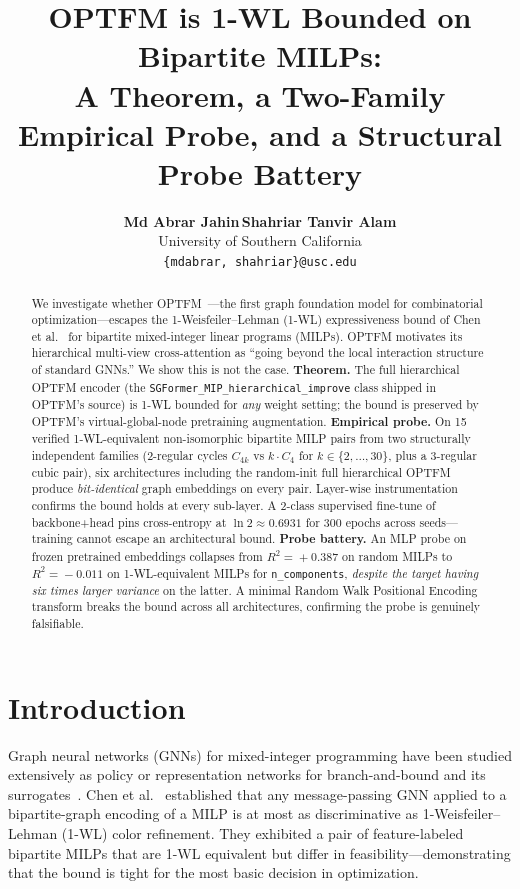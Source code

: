 \documentclass[11pt]{article}
\title{\vspace{-1.3cm}\textbf{\Large OPTFM is 1-WL Bounded on Bipartite MILPs:\\
A Theorem, a Two-Family Empirical Probe, and a Structural Probe Battery}}
\author{
\textbf{Md Abrar Jahin}\;\,\textbf{Shahriar Tanvir Alam}\\
University of Southern California\\
\texttt{\{mdabrar, shahriar\}@usc.edu}
}
\date{}
\theoremstyle{plain}
\theoremstyle{definition}
\theoremstyle{remark}
\newcommand{\optfm}{\textsc{OPTFM}}
\begin{document}
\maketitle
\thispagestyle{empty}

\begin{abstract}
\noindent
We investigate whether \optfm{}~\cite{yuan2025optfm}---the first graph foundation
model for combinatorial optimization---escapes the 1-Weisfeiler--Lehman (1-WL)
expressiveness bound of Chen et al.~\cite{chen2023expressive} for bipartite
mixed-integer linear programs (MILPs). \optfm{} motivates its hierarchical
multi-view cross-attention as ``going beyond the local interaction structure of
standard GNNs.'' We show this is not the case. \textbf{Theorem.} The full
hierarchical \optfm{} encoder (the \texttt{SGFormer\_MIP\_hierarchical\_improve}
class shipped in \optfm{}'s source) is 1-WL bounded for \emph{any} weight
setting; the bound is preserved by \optfm{}'s virtual-global-node pretraining
augmentation. \textbf{Empirical probe.} On 15 verified 1-WL-equivalent
non-isomorphic bipartite MILP pairs from two structurally independent families
(2-regular cycles \(C_{4k}\) vs \(k\cdot C_4\) for \(k\!\in\!\{2,\dots,30\}\),
plus a 3-regular cubic pair), six architectures including the random-init full
hierarchical \optfm{} produce \emph{bit-identical} graph embeddings on every
pair. Layer-wise instrumentation confirms the bound holds at every sub-layer.
A 2-class supervised fine-tune of backbone+head pins cross-entropy at
\(\ln 2\!\approx\!0.6931\) for 300 epochs across seeds---training cannot
escape an architectural bound. \textbf{Probe battery.} An MLP probe on frozen
pretrained embeddings collapses from \(R^2\!=\!{+}0.387\) on random MILPs to
\(R^2\!=\!{-}0.011\) on 1-WL-equivalent MILPs for \texttt{n\_components},
\emph{despite the target having six times larger variance} on the latter.
A minimal Random Walk Positional Encoding transform breaks the bound across
all architectures, confirming the probe is genuinely falsifiable.
\end{abstract}

\section{Introduction}
\label{sec:intro}

Graph neural networks (GNNs) for mixed-integer programming have been studied
extensively as policy or representation networks for branch-and-bound and
its surrogates~\citep{gasse2019exact, khalil2017learning, gupta2020hybrid}.
Chen et al.~\cite{chen2023expressive} established that any message-passing
GNN applied to a bipartite-graph encoding of a MILP is at most as
discriminative as 1-Weisfeiler--Lehman (1-WL) color refinement. They
exhibited a pair of feature-labeled bipartite MILPs that are 1-WL equivalent
but differ in feasibility---demonstrating that the bound is tight for the
most basic decision in optimization.
\end{document}
